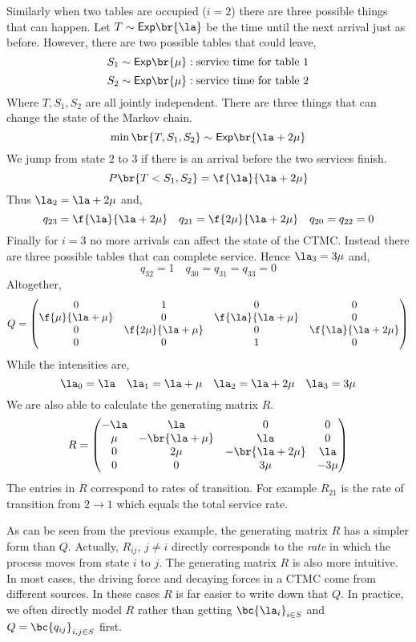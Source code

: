 \documentclass{article}
\newcommand{\Ex}{\mathsf{Exp}}
\begin{document}
\begin{example}
        Similarly when two tables are occupied ($i = 2$) there are three possible things that can happen. Let $T \sim \Ex\br{\la}$ be the time until the next arrival just as before. However, there are two possible tables that could leave,
        \[ S_1 \sim \Ex\br{\mu} : \text{service time for table $1$} \]
        \[ S_2 \sim \Ex\br{\mu} : \text{service time for table $2$} \]
        Where $T,S_1,S_2$ are all jointly independent. There are three things that can change the state of the Markov chain.
        \[ \min \br{T, S_1, S_2} \sim \Ex\br{\la + 2 \mu} \]
        We jump from state $2$ to $3$ if there is an arrival before the two services finish.
        \[ P\br{T < S_1, S_2} = \f{\la}{\la+2\mu}\]
        Thus $\la_2 = \la +2\mu$ and,
        \[ q_{23} = \f{\la}{\la+2\mu} \quad q_{21} = \f{2\mu}{\la + 2\mu} \quad q_{20} = q_{22} = 0 \]
        Finally for $i = 3$ no more arrivals can affect the state of the CTMC. Instead there are three possible tables that can complete service. Hence $\la_3 = 3 \mu$ and,
        \[ q_{32} = 1 \quad q_{30} = q_{31} = q_{33} = 0 \]
        Altogether,
        \[ Q = \begin{pmatrix}
            0 & 1 & 0 & 0 \\
            \f{\mu}{\la + \mu} & 0 & \f{\la}{\la + \mu} & 0 \\
            0 & \f{2\mu}{\la + \mu} & 0 & \f{\la}{\la + 2\mu} \\
            0 & 0 & 1 & 0 \\
        \end{pmatrix} \]
        While the intensities are,
        \[ \la_0 = \la \quad \la_1 = \la + \mu \quad \la_2 = \la + 2 \mu \quad \la_3 = 3 \mu \]
        We are also able to calculate the generating matrix $R$.
        \[ R = \begin{pmatrix}
            -\la & \la & 0 & 0 \\
            \mu & -\br{\la + \mu} & \la & 0 \\
            0 & 2 \mu & -\br{\la + 2 \mu} & \la \\
            0 & 0 & 3 \mu & -3\mu \\
        \end{pmatrix} \]
        The entries in $R$ correspond to rates of transition. For example $R_{21}$ is the rate of transition from $2 \to 1$ which equals the total service rate.
    \end{example}
    \begin{remark}
        As can be seen from the previous example, the generating matrix $R$ has a simpler form than $Q$. Actually, $R_{ij}$, $j \neq i$ directly corresponds to the \textit{rate} in which the process moves from state $i$ to $j$. The generating matrix $R$ is also more intuitive. In most cases, the driving force and decaying forces in a CTMC come from different sources. In these cases $R$ is far easier to write down that $Q$. In practice, we often directly model $R$ rather than getting $\bc{\la_i}_{i \in S}$ and $Q = \bc{q_{ij}}_{i,j \in S}$ first.
    \end{remark}
\end{document}
